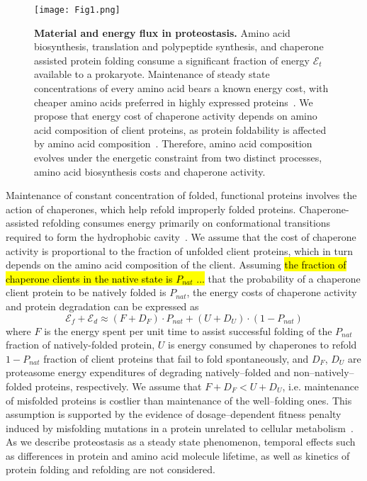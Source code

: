 \documentclass[10pt,letterpaper]{article}
\begin{document}
\begin{figure}[h!]
\texttt{[image: Fig1.png]}
\caption{
{\bf Material and energy flux in proteostasis.}  Amino acid biosynthesis, translation and polypeptide synthesis, and chaperone assisted protein folding consume a significant fraction of energy $\mathcal{E}_{t}$ available to a prokaryote. Maintenance of steady state concentrations of every amino acid bears a known energy cost, with cheaper amino acids preferred in highly expressed proteins~\cite{Akashi2002Metabolic}. We propose that energy cost of chaperone activity depends on amino acid composition of client proteins, as protein foldability is affected by amino acid composition~\cite{Dill1985Theory,Berezovsky2007Positive,Venev2015Massively}. Therefore, amino acid composition evolves under the energetic constraint from two distinct processes, amino acid biosynthesis costs and chaperone activity.
}
\label{fig:fig1}
\end{figure}


Maintenance of constant concentration of folded, functional proteins involves the action of chaperones, which help refold improperly folded proteins. Chaperone-assisted refolding consumes energy primarily on conformational transitions required to form the hydrophobic cavity~\cite{Hartl2011Molecular}. We assume that the cost of chaperone activity is proportional to the fraction of unfolded client proteins, which in turn depends on the amino acid composition of the client. Assuming \hl{the fraction of chaperone clients in the native state is $P_{nat}$ ...} that the probability of a chaperone client protein to be natively folded is $P_{nat}$, the energy costs of chaperone activity and protein degradation can be expressed as 
\begin{equation}
	\label{chaperone_degradation_cost}
	\mathcal{E}_{f} + \mathcal{E}_{d} \approx (F+D_{F})\cdot P_{nat} + (U+D_{U})\cdot\left(1-P_{nat}\right)
\end{equation}
where $F$ is the energy spent per unit time to assist successful folding of the $P_{nat}$ fraction of natively-folded protein, $U$ is energy consumed by chaperones to refold $1-P_{nat}$ fraction of client proteins that fail to fold spontaneously, and $D_F$, $D_U$ are proteasome energy expenditures of degrading natively--folded and non--natively--folded proteins, respectively. We assume that $F+D_{F}<U+D_{U}$, i.e. maintenance of misfolded proteins is costlier than maintenance of the well--folding ones. This assumption is supported by the evidence of dosage--dependent fitness penalty induced by misfolding mutations in a protein unrelated to cellular metabolism~\cite{Samerotte2011Misfolded}. As we describe proteostasis as a steady state phenomenon, temporal effects such as differences in protein and amino acid molecule lifetime, as well as kinetics of protein folding and refolding are not considered.
\end{document}
